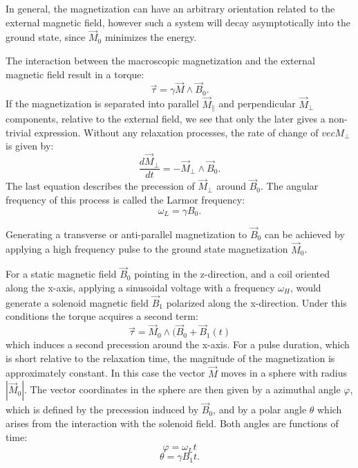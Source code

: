 In general, the magnetization can have an arbitrary orientation related to the external magnetic field, however such a system will decay asymptotically into the ground state, since $\vec{M}_0$ minimizes the energy. 

The interaction between the macroscopic magnetization and the external magnetic field result in a torque:
\begin{equation}
\vec{\tau} = \gamma\vec{M} \wedge\vec{B}_0.
\end{equation}
If the magnetization is separated into parallel $\vec{M}_{\parallel}$ and perpendicular $\vec{M}_{\perp}$ components, relative to the external field, we  see that only the later gives a non-trivial expression. Without any relaxation processes, the rate of change of $vec{M}_\perp$ is given by:
\begin{equation}
\frac{d \vec{M}_{\perp}}{dt} = -\vec{M}_{\perp}\wedge\vec{B}_0.
\end{equation}
The last equation describes the precession of $\vec{M}_{\perp}$ around $\vec{B}_0$. The angular frequency of this process is called the Larmor frequency:
\begin{equation}
\label{eq: larmor freq}
\omega_L = \gamma B_0.
\end{equation}

Generating a transverse or anti-parallel magnetization to $\vec{B}_0$ can be achieved by applying a high frequency pulse to the ground state magnetization $\vec{M}_0$. 

For a static magnetic field $\vec{B}_0$ pointing in the z-direction, and a coil oriented along the x-axis, applying a sinusoidal voltage with a frequency $\omega_H$, would generate a solenoid magnetic field $\vec{B}_1$ polarized along the x-direction. Under this conditions the torque  acquires a second term:
\begin{equation}
\vec{\tau} = \vec{M}_0\wedge(\vec{B}_0 + \vec{B}_1(t)
\end{equation}
which induces a second precession around the x-axis.
For a pulse duration, which is short relative to the relaxation time, the magnitude of the magnetization is approximately constant. In this case the vector $\vec{M}$ moves in a sphere with radius $|\vec{M}_0|$. The vector coordinates in the sphere are then given by a azimuthal angle $\varphi$, which is defined by the precession induced by $\vec{B}_0$, and by a polar angle $\theta$ which arises from the interaction with the solenoid field. Both angles are functions of time:
\begin{equation}
\varphi = \omega_L t
\end{equation}
\begin{equation}
\theta = \gamma B_1 t.
\end{equation}

